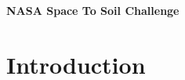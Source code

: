 \documentclass[11pt,letterpaper]{article}
\theoremstyle{plain}
\theoremstyle{definition}
\theoremstyle{remark}
\begin{document}
\setcounter{page}{1}



%




\setcounter{page}{1}
\begin{center}
{\Large \textbf{
NASA Space To Soil Challenge
}} 
\end{center}


\section{Introduction} \label{sec:intro}
\end{document}
